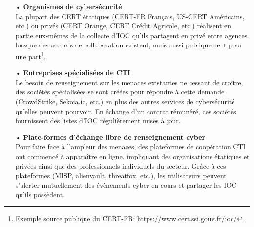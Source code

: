 \begin{itemize}[itemsep=1em]
    \item[•] \textbf{Organismes de cybersécurité}\\
    La plupart des CERT étatiques (CERT-FR Français, US-CERT Américains, etc.) ou privés (CERT Orange, CERT Crédit Agricole, etc.) réalisent en partie eux-mêmes de la collecte d'IOC qu'ils partagent en privé entre agences lorsque des accords de collaboration existent, mais aussi publiquement pour une part\footnote{Exemple source publique du CERT-FR: \url{https://www.cert.ssi.gouv.fr/ioc/}}.
    \item[•] \textbf{Entreprises spécialisées de CTI}\\
    Le besoin de renseignement sur les menaces existantes ne cessant de croître, des sociétés spécialisées se sont créées pour répondre à cette demande (CrowdStrike, Sekoia.io, etc.) en plus des autres services de cybersécurité qu'elles peuvent pourvoir. En échange d'un contrat rémunéré, ces sociétés fournissent des listes d'IOC régulièrement mises à jour.
    \item[•] \textbf{Plate-formes d'échange libre de renseignement cyber}\\
    Pour faire face à l'ampleur des menaces, des plateformes de coopération CTI ont commencé à apparaître en ligne, impliquant des organisations étatiques et privées ainsi que des professionnels individuels du secteur. Grâce à ces plateformes (MISP, alienvault, threatfox, etc.), les utilisateurs peuvent s'alerter mutuellement des évènements cyber en cours et partager les IOC qu'ils possèdent.
\end{itemize}